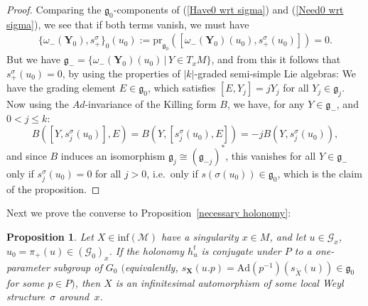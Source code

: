 \documentclass[11pt]{article}
\def\g{\mathfrak{g}}
\def\Gbdle{\mathcal{G}}
\theoremstyle{plain}
\newtheorem{Proposition}[Theorem]{Proposition}
\theoremstyle{definition}
\begin{document}
\begin{proof}
 Comparing the $\g_0$-components of (\ref{Have0 wrt sigma}) and (\ref{Need0 wrt sigma}), we see that if both terms vanish, we must have
\begin{gather*}
\{\omega_{-}(\mathbf{Y}_0),s^{\sigma}_+\}_0(u_0) := \mathrm{pr}_{\g_0}([\omega_{-}(\mathbf{Y}_0)(u_0),s^{\sigma}_+(u_0)]) = 0.
\end{gather*}
But we have $\g_- = \{\omega_{-}(\mathbf{Y}_0)(u_0) \, \vert \, Y \in T_xM\}$, and from this it follows that $s^{\sigma}_+(u_0) = 0$, by using the properties of $\vert k \vert$-graded semi-simple Lie algebras: We have the grading element $E \in \g_0$, which satisf\/ies $[E,Y_j] = jY_j$ for all $Y_j \in \g_j$. Now using the $Ad$-invariance of the Killing form $B$, we have, for any $Y \in \g_-$, and $0 < j \leq k$:
\[
B([Y,s^{\sigma}_j(u_0)],E) = B(Y,[s^{\sigma}_j(u_0),E]) = -jB(Y,s^{\sigma}_j(u_0)),
\]
and since $B$ induces an isomorphism $\g_j \cong (\g_{-j})^*$, this vanishes for all $Y \in \g_-$ only if $s^{\sigma}_j(u_0) = 0$ for all $j > 0$, i.e.\ only if $s(\sigma(u_0)) \in \g_0$, which is the claim of the proposition.
\end{proof}

Next we prove the converse to Proposition~\ref{necessary holonomy}:

\begin{Proposition} \label{sufficient holonomy} Let $X \in \mathrm{inf}(\mathcal{M})$ have a singularity $x \in M$, and let $u \in \Gbdle_x$, $u_0 = \pi_+(u) \in (\Gbdle_0)_x$. If the holonomy $h_u^t$ is conjugate under $P$ to a one-parameter subgroup of $G_0$ $($equivalently, $s_{\mathbf{X}}(u.p) = \mathrm{Ad}(p^{-1})(s_{\tilde{X}}(u)) \in \g_0$ for some $p \in P)$, then $X$ is an infinitesimal automorphism of some local Weyl structure~$\sigma$ around~$x$.
\end{Proposition}
\end{document}
